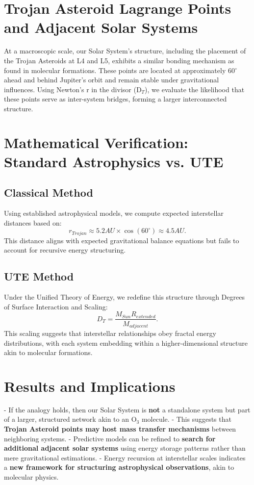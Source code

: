 \documentclass{article}
\begin{document}
\section{Trojan Asteroid Lagrange Points and Adjacent Solar Systems}
At a macroscopic scale, our Solar System’s structure, including the placement of the Trojan Asteroids at L4 and L5, exhibits a similar bonding mechanism as found in molecular formations. These points are located at approximately 60$^\circ$ ahead and behind Jupiter’s orbit and remain stable under gravitational influences. Using Newton’s r in the divisor (D$_T$), we evaluate the likelihood that these points serve as inter-system bridges, forming a larger interconnected structure.

\section{Mathematical Verification: Standard Astrophysics vs. UTE}
\subsection{Classical Method}
Using established astrophysical models, we compute expected interstellar distances based on:
\begin{equation}
    r_{Trojan} \approx 5.2 AU \times \cos(60^\circ) \approx 4.5 AU.
\end{equation}
This distance aligns with expected gravitational balance equations but fails to account for recursive energy structuring.

\subsection{UTE Method}
Under the Unified Theory of Energy, we redefine this structure through Degrees of Surface Interaction and Scaling:
\begin{equation}
    D_T = \frac{M_{Sun} R_{extended}}{M_{adjacent}}.
\end{equation}
This scaling suggests that interstellar relationships obey fractal energy distributions, with each system embedding within a higher-dimensional structure akin to molecular formations.

\section{Results and Implications}
- If the analogy holds, then our Solar System is \textbf{not} a standalone system but part of a larger, structured network akin to an O$_3$ molecule.
- This suggests that \textbf{Trojan Asteroid points may host mass transfer mechanisms} between neighboring systems.
- Predictive models can be refined to \textbf{search for additional adjacent solar systems} using energy storage patterns rather than mere gravitational estimations.
- Energy recursion at interstellar scales indicates a \textbf{new framework for structuring astrophysical observations}, akin to molecular physics.
\end{document}
